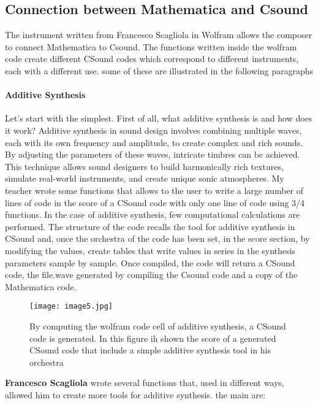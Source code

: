		\subsection{Connection between Mathematica and Csound}
		The instrument written from Francesco Scagliola in Wolfram allows the composer to connect Mathematica to Csound.
		The functions written inside the wolfram code create different CSound codes which correspond to different instruments, each with a different use. some of these are illustrated in the following paragraphs
		
		\paragraph{Additive Synthesis} Let's start with the simplest.
		First of all, what additive synthesis is and how does it work?
		Additive synthesis in sound design involves combining multiple waves, each with its own frequency and amplitude, to create complex and rich sounds. By adjusting the parameters of these waves, intricate timbres can be achieved. This technique allows sound designers to build harmonically rich textures, simulate real-world instruments, and create unique sonic atmospheres.
		My teacher wrote some functions that allows to the user to write a large number of lines of code in the score of a CSound code with only one line of code using 3/4 functions. In the case of additive synthesis, few computational calculations are performed. 
		The structure of the code recalls the tool for additive synthesis in CSound and, once the orchestra of the code has been set, in the score section, by modifying the values, create tables that write values in series in the synthesis parameters sample by sample. Once compiled, the code will return a CSound code, the file.wave generated by compiling the Csound code and a copy of the Mathematica code.
		
		\begin{figure}[h]
			\begin{center}
				\texttt{[image: image5.jpg]}
				\caption{By computing the wolfram code cell of additive synthesis, a CSound code is generated. In this figure ih shown the score of a generated CSound code that include a simple additive synthesis tool in his orchestra}
			\end{center}
		\end{figure}
		
		\textbf{Francesco Scagliola} wrote several functions that, used in different ways, allowed him to create more tools for additive synthesis. the main are:
		
